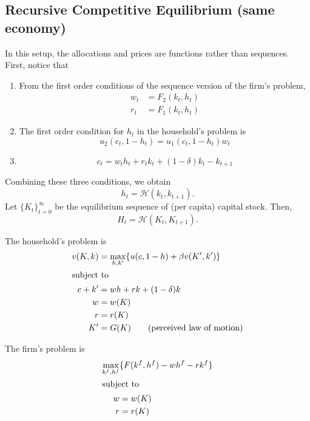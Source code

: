 \documentclass[11pt]{article}
\begin{document}
\subsection{Recursive Competitive Equilibrium (same economy)}
\label{sec:orga8d1ff3}
In this setup, the allocations and prices are functions rather than sequences. First, notice that
\begin{enumerate}
\item From the first order conditions of the sequence version of the firm's problem,
\begin{align*}
w_t &= F_2(k_t, h_t)\\
r_t &= F_1(k_t, h_t)
\end{align*}
\item The first order condition for $h_t$ in the household's problem is
\[
u_2(c_t, 1 - h_t) = u_1(c_t, 1 - h_t)w_t
\]
\item
\[
c_t = w_t h_t + r_t k_t + (1 - \delta)k_t - k_{t + 1}
\]
\end{enumerate}
Combining these three conditions, we obtain
\[
h_t = \mathcal{H}(k_t, k_{t + 1}).
\]
Let \(\{K_t\}^\infty_{t = 0}\) be the equilibrium sequence of (per capita) capital stock. Then,
\[
H_t = \mathcal{H} (K_t, K_{t + 1}).
\]

The household's problem is
\begin{align*}
v(K, k) &= \max_{h, k'} \{u(c, 1 - h) + \beta v(K', k')\}\\
\intertext{subject to}
c + k' &= wh + rk + (1 - \delta)k\\
w &= w(K)\\
r &= r(K)\\
K' &= G(K) \tag{perceived law of motion}
\end{align*}

The firm's problem is
\begin{align*}
\max_{k^f, h^f} &\{F(k^f, h^f) - wh^f - rk^f\}\\
\intertext{subject to}
w &= w(K)\\
r &= r(K)
\end{align*}
\end{document}
